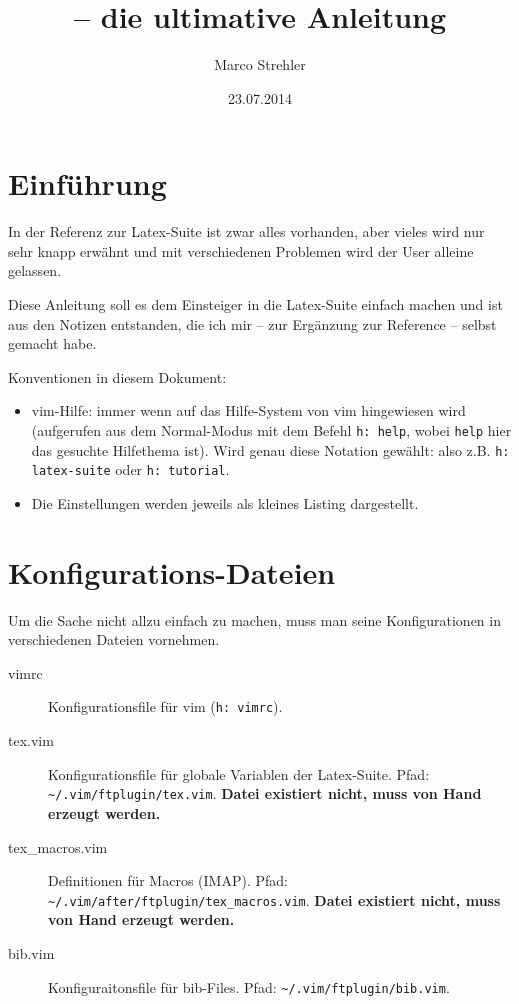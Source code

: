 \documentclass[a4paper,parskip=half,draft=true,DIV=15]{scrartcl}
\title{\LS{} -- die ultimative Anleitung}
\author{Marco Strehler}
\date{23.07.2014}
\newcommand{\LS}{Latex-Suite}
\newcommand{\vimhNP}[1]{\texttt{h: #1}}
\newcommand{\vimh}[1]{(\vimhNP{#1})}
\begin{document}
 

\maketitle

\section{Einführung}

In der Referenz zur \LS{} ist zwar alles vorhanden, aber vieles wird
nur sehr knapp erwähnt und mit verschiedenen Problemen wird der User alleine
gelassen.

Diese Anleitung soll es dem Einsteiger in die \LS{} einfach machen und
ist aus den Notizen entstanden, die ich mir -- zur Ergänzung zur Reference --
selbst gemacht habe.

Konventionen in diesem Dokument:

\begin{itemize}
  \item vim-Hilfe: immer wenn auf das Hilfe-System von vim hingewiesen wird
    (aufgerufen aus dem Normal-Modus mit dem Befehl \vimhNP{help}, wobei
    \texttt{help} hier das gesuchte Hilfethema ist). Wird genau diese Notation
    gewählt: also z.B. \vimhNP{latex-suite} oder \vimhNP{tutorial}.
  \item Die Einstellungen werden jeweils als kleines Listing dargestellt.
\end{itemize}

\section{Konfigurations-Dateien}

Um die Sache nicht allzu einfach zu machen, muss man seine Konfigurationen in verschiedenen Dateien vornehmen.

\begin{description}
  \item[vimrc] Konfigurationsfile für vim \vimh{vimrc}.
  \item[tex.vim] Konfigurationsfile für globale Variablen der \LS.
    Pfad: \texttt{\textasciitilde/.vim/ftplugin/tex.vim}. \textbf{Datei existiert nicht, muss von Hand erzeugt werden.}
  \item[tex\_macros.vim] Definitionen für Macros (IMAP).
    Pfad: \texttt{\textasciitilde/.vim/after/ftplugin/tex\_macros.vim}. \textbf{Datei existiert nicht, muss von Hand erzeugt werden.}
	\item[bib.vim] Konfiguraitonsfile für bib-Files.
	  Pfad: \texttt{\textasciitilde/.vim/ftplugin/bib.vim}.
\end{description}
\end{document}
